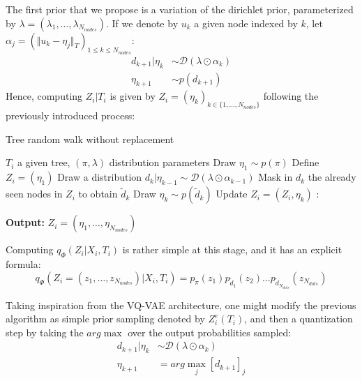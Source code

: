 The first prior that we propose is a variation of the dirichlet prior, parameterized by $\lambda = (\lambda_1, \dots, \lambda_{N_{nodes}})$.
If we denote by $u_k$ a given node indexed by $k$, let $\alpha_j = (\Vert u_k - \eta_j \Vert_T)_{1 \leq k \leq N_{nodes}}$:
$$
\begin{align}
    d_{k+1} | \eta_{k} &\sim \mathcal{D}(\lambda \odot \alpha_k) \\
    \eta_{k+1} &\sim p(d_{k+1})
\end{align}
$$
Hence, computing $Z_i | T_i$ is given by $Z_i = (\eta_k)_{k \in \{1, \dots, N_{nodes}\}}$ following the previously introduced process:
\begin{algorithm}[H]
    \caption{Tree random walk without replacement}
    \begin{algorithmic}
        \REQUIRE $T_i$ a given tree, $(\pi, \lambda)$ distribution parameters
        \STATE Draw $\eta_{1} \sim p(\pi)$
        \STATE Define $Z_i = (\eta_{1})$
            \STATE \quad Draw a distribution $d_{k} | \eta_{k-1} \sim \mathcal{D}(\lambda \odot \alpha_{k-1})$
            \STATE \quad Mask in $d_{k}$ the already seen nodes in $Z_i$ to obtain $\tilde{d}_{k}$
            \STATE \quad Draw $\eta_{k} \sim p(\tilde{d}_{k})$
            \STATE \quad Update $Z_i = (Z_i, \eta_k)$
        \EndFor:
    \end{algorithmic}

    \textbf{Output:} $Z_i = (\eta_1, \dots, \eta_{N_{nodes}})$

    \label{alg:tree_walk_no_replacement}
\end{algorithm}

Computing $q_{\Phi}(Z_i | X_i, T_i)$ is rather simple at this stage, and it has an explicit formula:
$$
q_{\Phi}(Z_i = (z_1, \dots, z_{N_{nodes}}) | X_i, T_i) = p_{\pi}(z_1) p_{\tilde{d}_1}(z_2) \dots p_{\tilde{d}_{N_{dots}}}(z_{N_{dots}})
$$

Taking inspiration from the VQ-VAE architecture, one might modify the previous algorithm as simple prior sampling denoted by $Z_i^e(T_i)$,
and then a quantization step by taking the $arg\max$ over the output probabilities sampled:
$$
\begin{align}
    d_{k+1} | \eta_{k} &\sim \mathcal{D}(\lambda \odot \alpha_k) \\
    \eta_{k+1} &= arg\max_{j} [d_{k+1}]_j
\end{align}
$$

